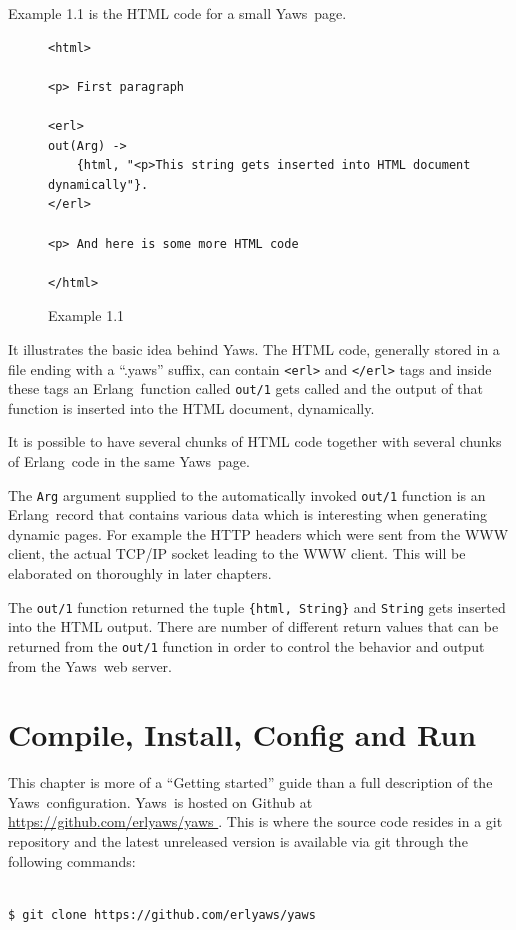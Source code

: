\documentclass[11pt,oneside,english]{book}
\newcommand{\Erlang}            %
        {{\sc Erlang}}
\newcommand{\Yaws}            %
        {{\sc Yaws}}
\begin{document}
Example 1.1 is the HTML code for a small \Yaws\  page.


\begin{figure}[h]
\begin{verbatim}
<html>

<p> First paragraph

<erl>
out(Arg) ->
    {html, "<p>This string gets inserted into HTML document dynamically"}.
</erl>

<p> And here is some more HTML code

</html>
\end{verbatim}
\caption{Example 1.1}
\end{figure}

It illustrates the basic idea behind \Yaws{}. The HTML code, generally
stored in a file ending with a ``.yaws'' suffix, can contain
\verb+<erl>+ and \verb+</erl>+ tags and inside these tags an
\Erlang\ function called \verb+out/1+ gets called and the output of
that function is inserted into the HTML document, dynamically.

It is possible to have several chunks of HTML code together with several
chunks of \Erlang\  code in the same \Yaws\  page.

The \verb+Arg+ argument supplied to the automatically invoked \verb+out/1+
function is an \Erlang\  record that contains various data which is interesting
when generating dynamic pages. For example the HTTP headers which were sent
from the WWW client, the actual TCP/IP socket leading to the WWW client.
This will be elaborated on thoroughly in later chapters.

The \verb+out/1+ function returned the tuple \verb+{html, String}+ and
\verb+String+ gets inserted into the HTML output. There are number
of different return values that can be returned from the \verb+out/1+ function
in order to control the behavior and output from the \Yaws\  web server.


\chapter{Compile, Install, Config and Run}

This chapter is more of a ``Getting started'' guide than a full
description of the \Yaws\ configuration.  \Yaws\ is hosted on Github
at \url{ https://github.com/erlyaws/yaws }. This is where the source
code resides in a git repository and the latest unreleased version is
available via git through the following commands:

\begin{verbatim}

$ git clone https://github.com/erlyaws/yaws

\end{verbatim}
\end{document}
